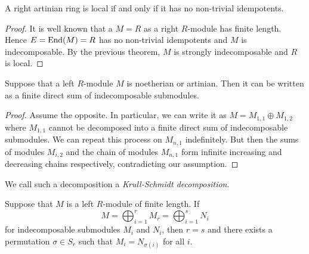\begin{posledica}
A right artinian ring is local if and only if it has no non-trivial
idempotents.
\end{posledica}

\begin{proof}
It is well known that a $M = R$ as a right $R$-module has finite
length. Hence $E = \operatorname{End}(M) = R$ has no non-trivial idempotents and
$M$ is indecomposable. By the previous theorem, $M$ is strongly
indecomposable and $R$ is local.
\end{proof}

\begin{trditev}
Suppose that a left $R$-module $M$ is noetherian or artinian. Then
it can be written as a finite direct sum of indecomposable
submodules.
\end{trditev}

\begin{proof}
Assume the opposite. In particular, we can write it as
$M = M_{1,1} \oplus M_{1,2}$ where $M_{1,1}$ cannot be decomposed
into a finite direct sum of indecomposable submodules. We can
repeat this process on $M_{n,1}$ indefinitely. But then the sums of
modules $M_{i,2}$ and the chain of modules $M_{n,1}$ form infinite
increasing and decreasing chains respectively, contradicting our
assumption.
\end{proof}

\begin{definicija}
We call such a decomposition a
\emph{Krull-Schmidt decomposition}.
\end{definicija}

\begin{izrek}
Suppose that $M$ is a left $R$-module of finite length. If
\[
M = \bigoplus_{i=1}^r M_r = \bigoplus_{i=1}^s N_i
\]
for indecomposable submodules $M_i$ and $N_i$, then $r = s$ and
there exists a permutation $\sigma \in S_r$ such that
$M_i = N_{\sigma(i)}$ for all $i$.
\end{izrek}

